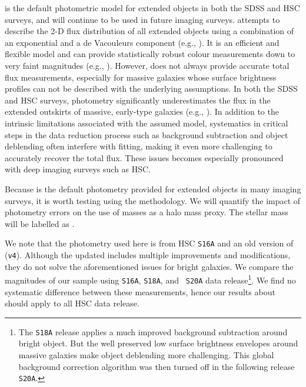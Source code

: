 \documentclass[fleqn,usenatbib,useAMS]{mnras}
\begin{document}
\begin{CJK*}{UTF8}{gbsn}
    \cmodel{} is the default photometric model for extended objects in both the SDSS and HSC
    surveys, and will continue to be used in future imaging surveys.
    \cmodel{} attempts to describe the 2-D flux distribution of all extended objects using a
    combination of an exponential and a de Vacouleurs component (e.g., \citealt{HSC-PIPE}).
    It is an efficient and flexible model and can provide statistically robust colour measurements
    down to very faint magnitudes (e.g., \citealt{SynPipe}).
    However, \cmodel{} does not always provide accurate total flux measurements, especially for
    massive galaxies whose surface brightness profiles can not be described with the underlying
    assumptions.
    In both the SDSS and HSC surveys, \cmodel{} photometry significantly underestimates the flux in
    the extended outskirts of massive, early-type galaxies (e.g., \citealt{Bernardi2013,
    Huang2018b}).
    In addition to the intrinsic limitations associated with the assumed model, systematics in 
    critical steps in the data reduction process such as background subtraction and object 
    deblending often interfere with \cmodel{} fitting, making it even more challenging to accurately
    recover the total flux.
    These issues becomes especially pronounced with deep imaging surveys such as HSC.

    Because \cmodel{} is the default photometry provided for extended objects in many imaging
    surveys, it is worth testing using the \topn{} methodology. 
    We will quantify the impact of \cmodel{} photometry errors on the use of  \cmodel{} masses 
    as a halo mass proxy. 
    The \cmodel{} stellar mass will be labelled as \mcmodel{}.
    
    We note that the \cmodel{} photometry used here is from HSC \texttt{S16A} and an old
    version of \hscpipe{} (\texttt{v4}).
    Although the updated \hscpipe{} includes multiple improvements and modifications, they do not
    solve the aforementioned issues for bright galaxies.
    We compare the \cmodel{} magnitudes of our sample using \texttt{S16A}, {\tt S18A}, and {\tt
    S20A} data release\footnote{The {\tt S18A} release applies a much improved background
    subtraction around bright object.  But the well preserved low surface brightness envelopes
    around massive galaxies make object deblending more challenging. This global background
    correction algorithm was then turned off in the following release {\tt S20A}.}. 
    We find no systematic difference between these measurements, hence our results about \mcmodel{}
    should apply to all HSC data release.
    

\end{CJK*}
\end{document}

